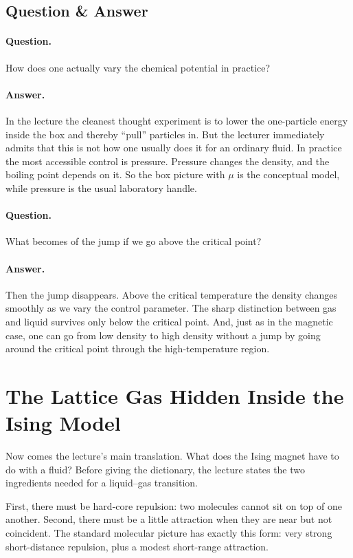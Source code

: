\subsection{Question \& Answer}

\paragraph{Question.} How does one actually vary the chemical potential in practice?

\paragraph{Answer.} In the lecture the cleanest thought experiment is to lower the one-particle energy inside the box and thereby ``pull'' particles in. But the lecturer immediately admits that this is not how one usually does it for an ordinary fluid. In practice the most accessible control is pressure. Pressure changes the density, and the boiling point depends on it. So the box picture with \(\mu\) is the conceptual model, while pressure is the usual laboratory handle.

\paragraph{Question.} What becomes of the jump if we go above the critical point?

\paragraph{Answer.} Then the jump disappears. Above the critical temperature the density changes smoothly as we vary the control parameter. The sharp distinction between gas and liquid survives only below the critical point. And, just as in the magnetic case, one can go from low density to high density without a jump by going around the critical point through the high-temperature region.

\section{The Lattice Gas Hidden Inside the Ising Model}

Now comes the lecture's main translation. What does the Ising magnet have to do with a fluid? Before giving the dictionary, the lecture states the two ingredients needed for a liquid--gas transition.

First, there must be hard-core repulsion: two molecules cannot sit on top of one another. Second, there must be a little attraction when they are near but not coincident. The standard molecular picture has exactly this form: very strong short-distance repulsion, plus a modest short-range attraction.

